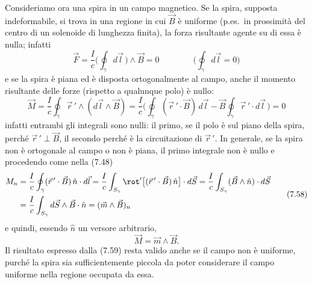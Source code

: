 Consideriamo ora una spira in un campo magnetico. Se la spira, supposta
indeformabile, si trova in una regione in cui $\vec B$ \`e uniforme (p.es.\ in
prossimit\`a del centro di un solenoide di lunghezza finita), la forza
risultante agente su di essa \`e nulla; infatti
\begin{equation}
  \vec F=\frac{I}{c}\Big(\oint_\gamma d\vec l\,\Big)\wedge\vec B=0
  \qquad\qquad\Big(\oint_\gamma d\vec l=0\Big)
  \tag{7.56}
\end{equation}
e se la spira \`e piana ed \`e disposta ortogonalmente al campo, anche il
momento risultante delle forze (rispetto a qualunque polo) \`e nullo:
\begin{equation}
  \vec M=\frac{I}{c}\oint_\gamma\vec r\,'\wedge(d\vec l\wedge\vec B)
  =\frac{I}{c}\Big(\oint_\gamma(\vec r\,'\cdot\vec B)\,d\vec l
  -\vec B\oint_\gamma\vec r\,'\cdot d\vec l\,\Big)=0
  \tag{7.57}
\end{equation}
infatti entrambi gli integrali sono nulli: il primo, se il polo \`e sul piano
della spira, perch\'e $\vec r\,'\perp\vec B$, il secondo perch\'e \`e la
circuitazione di $\vec r\,'$. In generale, se la spira non \`e ortogonale al
campo o non \`e piana, il primo integrale non \`e nullo e procedendo come nella
(7.48)
\begin{equation}
  \begin{aligned}
    M_n&=\frac{I}{c}\oint_\gamma(\vec r\,'\cdot\vec B)\,\hat n\cdot d\vec l
    =\frac{I}{c}\int_{S_\gamma}\rot'\big[(\vec r\,'\cdot\vec B)\,\hat n\big]
    \cdot d\vec S=\frac{I}{c}\int_{S_\gamma}(\vec B\wedge\hat n)\cdot d\vec S\\
    &=\frac{I}{c}\int_{S_\gamma}d\vec S\wedge\vec B\cdot\hat n
    =(\vec m\wedge\vec B)_n
  \end{aligned}
  \tag{7.58}
\end{equation}
e quindi, essendo $\hat n$ un versore arbitrario,
\begin{equation}
  \vec M=\vec m\wedge\vec B.
  \tag{7.59}
\end{equation}
Il risultato espresso dalla (7.59) resta valido anche se il campo non \`e
uniforme, purch\'e la spira sia sufficientemente piccola da poter considerare il
campo uniforme nella regione occupata da essa.

